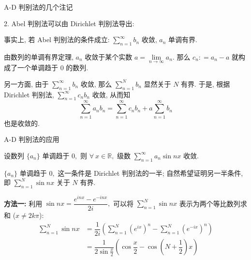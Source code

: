 \begin{frame}{A-D 判别法的几个注记}

2. Abel 判别法可以由 Dirichlet 判别法导出:

\pause
\vspace{0.8em}

事实上, 若 Abel 判别法的条件成立: $\sum\limits_{n=1}^{\infty} b_n$ 收敛, $a_n$ 单调有界. \par
由数列的单调有界定理, $a_n$ 收敛于某个实数 $a = \lim\limits_{n\to\infty} a_n.$ 那么 $c_n : = a_n - a$ 就构成了一个单调趋于 $0$ 的数列.

\pause
\vspace{0.8em}

另一方面, 由于 $\sum\limits_{n=1}^{\infty} b_n$ 收敛, 那么 $\sum\limits_{n=1}^{N} b_n$ 显然关于 $N$ 有界. 于是, 根据 Dirichlet 判别法, $\sum\limits_{n=1}^{\infty} c_nb_n$ 收敛, 从而知
\[\sum\limits_{n=1}^{\infty} a_nb_n = \sum\limits_{n=1}^{\infty} c_nb_n + a \sum\limits_{n=1}^{\infty} b_n\]
也是收敛的.

\end{frame}


\begin{frame}{A-D 判别法的应用}

\begin{eg}
设数列 $\{a_n\}$ 单调趋于 $0,$ 则 $\forall~x \in \mathbb{R},$ 级数 $\sum\limits_{n=1}^\infty a_n \sin nx$ 收敛.
\end{eg}

\pause
\vspace{0.4em}

\startproof[bg=yellow, fg=red]
$\{a_n\}$ 单调趋于 $0,$ 这一条件是 Dirichlet 判别法的一半; 自然希望证明另一半条件, 即 $\sum\limits_{n=1}^N \sin nx$ 关于 $N$ 有界.

\pause

\textbf{方法一:} 利用 $\sin nx = \dfrac{e^{inx} - e^{-inx}}{2i},$ 可以将 $\sum\limits_{n=1}^N \sin nx$ 表示为两个等比数列求和 ($x \neq 2k\pi$):
\begin{align*}
\sum\limits_{n=1}^N \sin nx & = \dfrac{1}{2i} \left( \sum\limits_{n=1}^N \left(e^{ix}\right)^n - \sum\limits_{n=1}^N \left(e^{-ix}\right)^n \right) \\
& = \dfrac{1}{2\sin\frac{x}{2}} \left( \cos\dfrac{x}{2} - \cos \left(N + \dfrac{1}{2}\right) x \right)
\end{align*}

\end{frame}


